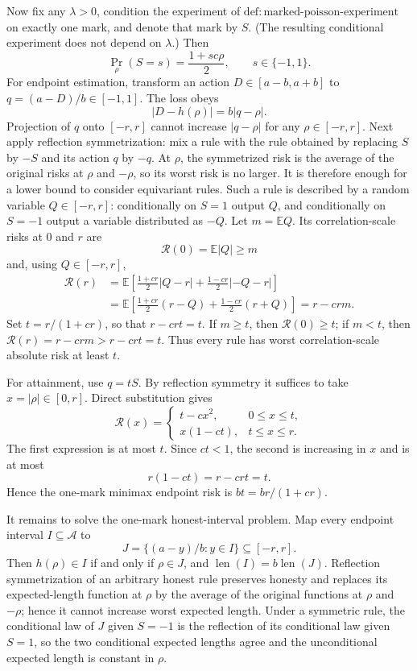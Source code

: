 Now fix any \(\lambda>0\), condition the experiment of \(\mathrm{def{:}marked\mbox{-}poisson\mbox{-}experiment}\) on exactly one mark, and denote that mark by \(S\).  (The resulting conditional experiment does not depend on \(\lambda\).)  Then
\[
 \Pr_\rho(S=s)=\frac{1+sc\rho}{2},\qquad s\in\{-1,1\}.
\]
For endpoint estimation, transform an action \(D\in[a-b,a+b]\) to \(q=(a-D)/b\in[-1,1]\).  The loss obeys
\[
 |D-h(\rho)|=b|q-\rho|.
\]
Projection of \(q\) onto \([-r,r]\) cannot increase \(|q-\rho|\) for any \(\rho\in[-r,r]\).  Next apply reflection symmetrization: mix a rule with the rule obtained by replacing \(S\) by \(-S\) and its action \(q\) by \(-q\).  At \(\rho\), the symmetrized risk is the average of the original risks at \(\rho\) and \(-\rho\), so its worst risk is no larger.  It is therefore enough for a lower bound to consider equivariant rules.  Such a rule is described by a random variable \(Q\in[-r,r]\): conditionally on \(S=1\) output \(Q\), and conditionally on \(S=-1\) output a variable distributed as \(-Q\).  Let \(m=\mathbb E Q\).  Its correlation-scale risks at \(0\) and \(r\) are
\[
 \mathcal R(0)=\mathbb E|Q|\geq m
\]
and, using \(Q\in[-r,r]\),
\[
 \begin{aligned}
 \mathcal R(r)
 &=\mathbb E\left[\frac{1+cr}{2}|Q-r|+\frac{1-cr}{2}|-Q-r|\right]\\
 &=\mathbb E\left[\frac{1+cr}{2}(r-Q)+\frac{1-cr}{2}(r+Q)\right]
 =r-crm.
 \end{aligned}
\]
Set \(t=r/(1+cr)\), so that \(r-crt=t\).  If \(m\geq t\), then \(\mathcal R(0)\geq t\); if \(m<t\), then \(\mathcal R(r)=r-crm>r-crt=t\).  Thus every rule has worst correlation-scale absolute risk at least \(t\).

For attainment, use \(q=tS\).  By reflection symmetry it suffices to take \(x=|\rho|\in[0,r]\).  Direct substitution gives
\[
 \mathcal R(x)=
 \begin{cases}
 t-cx^2,&0\leq x\leq t,\\
 x(1-ct),&t\leq x\leq r.
 \end{cases}
\]
The first expression is at most \(t\).  Since \(ct<1\), the second is increasing in \(x\) and is at most
\[
 r(1-ct)=r-crt=t.
\]
Hence the one-mark minimax endpoint risk is \(bt=br/(1+cr)\).

It remains to solve the one-mark honest-interval problem.  Map every endpoint interval \(I\subseteq\mathcal A\) to
\[
 J=\{(a-y)/b:y\in I\}\subseteq[-r,r].
\]
Then \(h(\rho)\in I\) if and only if \(\rho\in J\), and \(\operatorname{len}(I)=b\operatorname{len}(J)\).  Reflection symmetrization of an arbitrary honest rule preserves honesty and replaces its expected-length function at \(\rho\) by the average of the original functions at \(\rho\) and \(-\rho\); hence it cannot increase worst expected length.  Under a symmetric rule, the conditional law of \(J\) given \(S=-1\) is the reflection of its conditional law given \(S=1\), so the two conditional expected lengths agree and the unconditional expected length is constant in \(\rho\).

